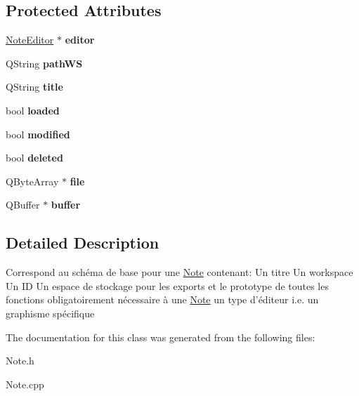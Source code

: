 \subsection*{\-Protected \-Attributes}
\begin{DoxyCompactItemize}
\item 
\hypertarget{classNote_a5196ce9d01fe207b10bdc9f8c874053c}{\hyperlink{classNoteEditor}{\-Note\-Editor} $\ast$ {\bfseries editor}}\label{classNote_a5196ce9d01fe207b10bdc9f8c874053c}

\item 
\hypertarget{classNote_a277563af352bd04c5603bdb0bb30869e}{\-Q\-String {\bfseries path\-W\-S}}\label{classNote_a277563af352bd04c5603bdb0bb30869e}

\item 
\hypertarget{classNote_ae8e10911c66931c9285925e1760816fd}{\-Q\-String {\bfseries title}}\label{classNote_ae8e10911c66931c9285925e1760816fd}

\item 
\hypertarget{classNote_a9edcd23344e067ded660deb97bc5ca4a}{bool {\bfseries loaded}}\label{classNote_a9edcd23344e067ded660deb97bc5ca4a}

\item 
\hypertarget{classNote_aaa3ed93cab78b04eebb5b5ba52722871}{bool {\bfseries modified}}\label{classNote_aaa3ed93cab78b04eebb5b5ba52722871}

\item 
\hypertarget{classNote_aeae11c0f8281ba3bfc7ec907cc9cf0b9}{bool {\bfseries deleted}}\label{classNote_aeae11c0f8281ba3bfc7ec907cc9cf0b9}

\item 
\hypertarget{classNote_a76bf0fff374aed4c754c262eeffc62bc}{\-Q\-Byte\-Array $\ast$ {\bfseries file}}\label{classNote_a76bf0fff374aed4c754c262eeffc62bc}

\item 
\hypertarget{classNote_ad1def1d9f3e46da1b0a577ac17c73401}{\-Q\-Buffer $\ast$ {\bfseries buffer}}\label{classNote_ad1def1d9f3e46da1b0a577ac17c73401}

\end{DoxyCompactItemize}


\subsection{\-Detailed \-Description}
\-Correspond au schéma de base pour une \hyperlink{classNote}{\-Note} contenant\-: \-Un titre \-Un workspace \-Un \-I\-D \-Un espace de stockage pour les exports et le prototype de toutes les fonctions obligatoirement nécessaire à une \hyperlink{classNote}{\-Note} un type d'éditeur i.\-e. un graphisme spécifique 

\-The documentation for this class was generated from the following files\-:\begin{DoxyCompactItemize}
\item 
\-Note.\-h\item 
\-Note.\-cpp\end{DoxyCompactItemize}
